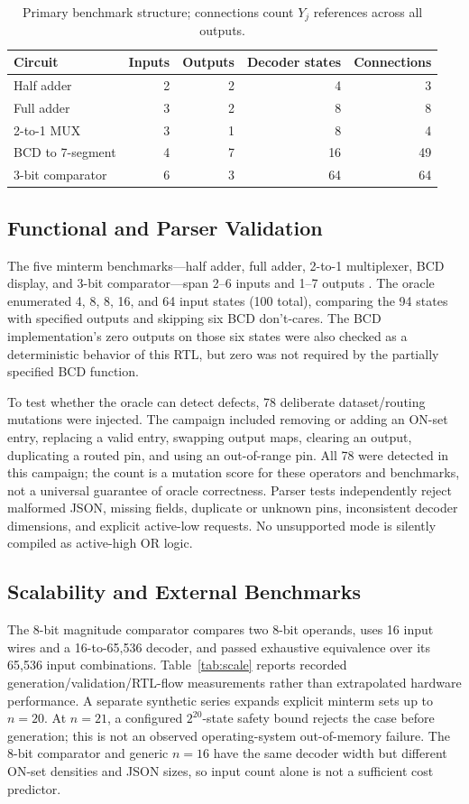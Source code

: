 \documentclass[runningheads]{llncs}
\begin{document}
\begin{table}[t]
\caption{Primary benchmark structure; connections count $Y_j$ references across all outputs.}
\label{tab:benchmarks}
\centering\small
\begin{tabular}{lrrrr}
\toprule
Circuit & Inputs & Outputs & Decoder states & Connections \\
\midrule
Half adder & 2 & 2 & 4 & 3 \\
Full adder & 3 & 2 & 8 & 8 \\
2-to-1 MUX & 3 & 1 & 8 & 4 \\
BCD to 7-segment & 4 & 7 & 16 & 49 \\
3-bit comparator & 6 & 3 & 64 & 64 \\
\bottomrule
\end{tabular}
\end{table}

\subsection{Functional and Parser Validation}
The five minterm benchmarks---half adder, full adder, 2-to-1 multiplexer, BCD display, and 3-bit comparator---span 2--6 inputs and 1--7 outputs \cite{benchmark_dataset}. The oracle enumerated 4, 8, 8, 16, and 64 input states (100 total), comparing the 94 states with specified outputs and skipping six BCD don't-cares. The BCD implementation's zero outputs on those six states were also checked as a deterministic behavior of this RTL, but zero was not required by the partially specified BCD function.

To test whether the oracle can detect defects, 78 deliberate dataset/routing mutations were injected. The campaign included removing or adding an ON-set entry, replacing a valid entry, swapping output maps, clearing an output, duplicating a routed pin, and using an out-of-range pin. All 78 were detected in this campaign; the count is a mutation score for these operators and benchmarks, not a universal guarantee of oracle correctness. Parser tests independently reject malformed JSON, missing fields, duplicate or unknown pins, inconsistent decoder dimensions, and explicit active-low requests. No unsupported mode is silently compiled as active-high OR logic.

\subsection{Scalability and External Benchmarks}
The 8-bit magnitude comparator compares two 8-bit operands, uses 16 input wires and a 16-to-65,536 decoder, and passed exhaustive equivalence over its 65,536 input combinations. Table~\ref{tab:scale} reports recorded generation/validation/RTL-flow measurements rather than extrapolated hardware performance. A separate synthetic series expands explicit minterm sets up to $n=20$. At $n=21$, a configured $2^{20}$-state safety bound rejects the case before generation; this is not an observed operating-system out-of-memory failure. The 8-bit comparator and generic $n=16$ have the same decoder width but different ON-set densities and JSON sizes, so input count alone is not a sufficient cost predictor.
\end{document}
